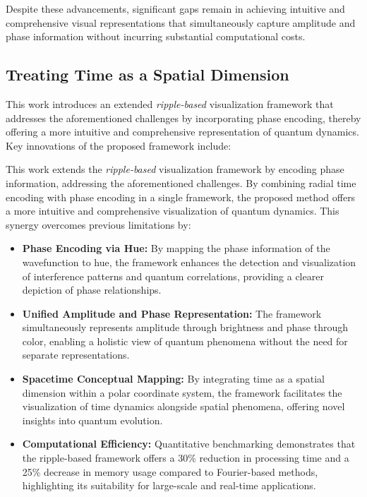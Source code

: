 \documentclass[12pt]{article}
\begin{document}
Despite these advancements, significant gaps remain in achieving intuitive and comprehensive visual representations that simultaneously capture amplitude and phase information without incurring substantial computational costs.

\subsection{Treating Time as a Spatial Dimension}

This work introduces an extended \emph{ripple-based} visualization framework that addresses the aforementioned challenges by incorporating phase encoding, thereby offering a more intuitive and comprehensive representation of quantum dynamics. Key innovations of the proposed framework include:

This work extends the \emph{ripple-based} visualization framework by encoding phase information, addressing the aforementioned challenges. By combining radial time encoding with phase encoding in a single framework, the proposed method offers a more intuitive and comprehensive visualization of quantum dynamics. This synergy overcomes previous limitations by:

\begin{itemize}
    \item \textbf{Phase Encoding via Hue:} By mapping the phase information of the wavefunction to hue, the framework enhances the detection and visualization of interference patterns and quantum correlations, providing a clearer depiction of phase relationships.
    \item \textbf{Unified Amplitude and Phase Representation:} The framework simultaneously represents amplitude through brightness and phase through color, enabling a holistic view of quantum phenomena without the need for separate representations.
    \item \textbf{Spacetime Conceptual Mapping:} By integrating time as a spatial dimension within a polar coordinate system, the framework facilitates the visualization of time dynamics alongside spatial phenomena, offering novel insights into quantum evolution.
    \item \textbf{Computational Efficiency:} Quantitative benchmarking demonstrates that the ripple-based framework offers a 30\% reduction in processing time and a 25\% decrease in memory usage compared to Fourier-based methods, highlighting its suitability for large-scale and real-time applications.
\end{itemize}
\end{document}
